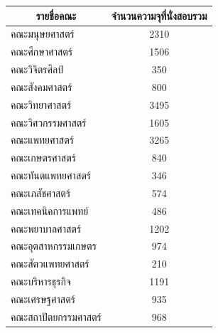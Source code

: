 \begin{table}[h]
  \centering
  \begin{tabular}{@{}lc@{}}
  \toprule
  \multicolumn{1}{c}{\textbf{รายชื่อคณะ}} & \multicolumn{1}{c}{\textbf{จำนวนความจุที่นั่งสอบรวม}} \\ \midrule
  คณะมนุษยศาสตร์                          & 2310                                                  \\
  คณะศึกษาศาสตร์                          & 1506                                                  \\
  คณะวิจิตรศิลป์                          & 350                                                   \\
  คณะสังคมศาสตร์                          & 800                                                   \\
  คณะวิทยาศาสตร์                          & 3495                                                  \\
  คณะวิศวกรรมศาสตร์                       & 1605                                                  \\
  คณะแพทยศาสตร์                           & 3265                                                  \\
  คณะเกษตรศาสตร์                          & 840                                                   \\
  คณะทันตแพทยศาสตร์                       & 346                                                   \\
  คณะเภสัชศาสตร์                          & 574                                                   \\
  คณะเทคนิคการแพทย์                       & 486                                                   \\
  คณะพยาบาลศาสตร์                         & 1202                                                  \\
  คณะอุตสาหกรรมเกษตร                      & 974                                                   \\
  คณะสัตวแพทยศาสตร์                       & 210                                                   \\
  คณะบริหารธุรกิจ                         & 1191                                                  \\
  คณะเศรษฐศาสตร์                          & 935                                                   \\
  คณะสถาปัตยกรรมศาสตร์                    & 968                                                   \\

\end{tabular}
\end{table}

